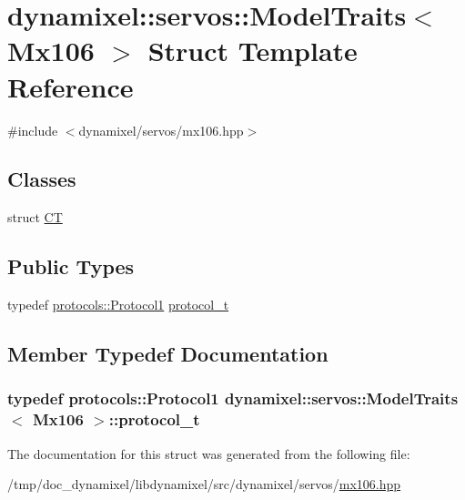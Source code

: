 \hypertarget{structdynamixel_1_1servos_1_1_model_traits_3_01_mx106_01_4}{}\section{dynamixel\+:\+:servos\+:\+:Model\+Traits$<$ Mx106 $>$ Struct Template Reference}
\label{structdynamixel_1_1servos_1_1_model_traits_3_01_mx106_01_4}


{\ttfamily \#include $<$dynamixel/servos/mx106.\+hpp$>$}

\subsection*{Classes}
\begin{DoxyCompactItemize}
\item 
struct \hyperlink{structdynamixel_1_1servos_1_1_model_traits_3_01_mx106_01_4_1_1_c_t}{C\+T}
\end{DoxyCompactItemize}
\subsection*{Public Types}
\begin{DoxyCompactItemize}
\item 
typedef \hyperlink{classdynamixel_1_1protocols_1_1_protocol1}{protocols\+::\+Protocol1} \hyperlink{structdynamixel_1_1servos_1_1_model_traits_3_01_mx106_01_4_a9c0caba66e8188713393008944bcf173}{protocol\+\_\+t}
\end{DoxyCompactItemize}


\subsection{Member Typedef Documentation}
\hypertarget{structdynamixel_1_1servos_1_1_model_traits_3_01_mx106_01_4_a9c0caba66e8188713393008944bcf173}{}
\subsubsection[{protocol\+\_\+t}]{\setlength{\rightskip}{0pt plus 5cm}typedef {\bf protocols\+::\+Protocol1} {\bf dynamixel\+::servos\+::\+Model\+Traits}$<$ {\bf Mx106} $>$\+::{\bf protocol\+\_\+t}}\label{structdynamixel_1_1servos_1_1_model_traits_3_01_mx106_01_4_a9c0caba66e8188713393008944bcf173}


The documentation for this struct was generated from the following file\+:\begin{DoxyCompactItemize}
\item 
/tmp/doc\+\_\+dynamixel/libdynamixel/src/dynamixel/servos/\hyperlink{mx106_8hpp}{mx106.\+hpp}\end{DoxyCompactItemize}
